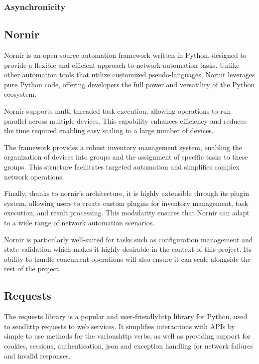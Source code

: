 \subsubsection{Asynchronicity}

\subsection{Nornir}
Nornir is an open-source automation framework written in Python, designed to provide a flexible and efficient 
approach to network automation tasks\cite{nornir2025}. Unlike other automation tools that utilize customized pseudo-languages, Nornir 
leverages pure Python code, offering developers the full power and versatility of the Python ecosystem.

Nornir supports multi-threaded task execution, allowing operations to run parallel across multiple devices.
This capability enhances efficiency and reduces the time required enabling easy scaling to a large number of devices.

The framework provides a robust inventory management system, enabling the organization of devices into groups and the 
assignment of specific tasks to these groups. This structure facilitates targeted automation and simplifies complex 
network operations.

Finally, thanks to nornir's architecture, it is highly extensible through its plugin system, allowing users to create 
custom plugins for inventory management, task execution, and result processing. This modularity ensures that Nornir can 
adapt to a wide range of network automation scenarios.

Nornir is particularly well-suited for tasks such as configuration management and state validation which makes it 
highly desirable in the context of this project. Its ability to handle concurrent operations will also ensure it can scale 
alongside the rest of the project.

\subsection{Requests}
The requests\cite{requests2025} library is a popular and user-friendly\ac{http} library for Python, used to send\ac{http} requests to web 
services. It simplifies interactions with APIs by simple to use methods for the various\ac{http} verbs, as well as
providing support for cookies, sessions, authentication, \ac{json} and exception handling for network failures and 
invalid responses.




